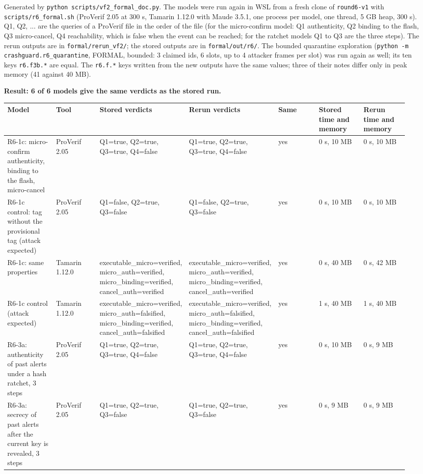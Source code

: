 


Generated by \texttt{python scripts/vf2\_formal\_doc.py}. The models were run again in WSL from a fresh clone of \texttt{round6-v1} with \texttt{scripts/r6\_formal.sh} (ProVerif 2.05 at 300 s, Tamarin 1.12.0 with Maude 3.5.1, one process per model, one thread, 5 GB heap, 300 s). Q1, Q2, ... are the queries of a ProVerif file in the order of the file (for the micro-confirm model: Q1 authenticity, Q2 binding to the flash, Q3 micro-cancel, Q4 reachability, which is false when the event can be reached; for the ratchet models Q1 to Q3 are the three steps). The rerun outputs are in \texttt{formal/rerun\_vf2/}; the stored outputs are in \texttt{formal/out/r6/}. The bounded quarantine exploration (\texttt{python -m crashguard.r6\_quarantine}, FORMAL, bounded: 3 claimed ids, 6 slots, up to 4 attacker frames per slot) was run again as well; its ten keys \texttt{r6.f3b.*} are equal. The \texttt{r6.f.*} keys written from the new outputs have the same values; three of their notes differ only in peak memory (41 against 40 MB).

\textbf{Result: 6 of 6 models give the same verdicts as the stored run.}

{\scriptsize\raggedright
\begin{longtable}{p{0.136\linewidth}p{0.136\linewidth}p{0.136\linewidth}p{0.136\linewidth}p{0.136\linewidth}p{0.136\linewidth}p{0.136\linewidth}}
\toprule
Model & Tool & Stored verdicts & Rerun verdicts & Same & Stored time and memory & Rerun time and memory \\
\midrule
\endhead
R6-1c: micro-confirm authenticity, binding to the flash, micro-cancel & ProVerif 2.05 & Q1=true, Q2=true, Q3=true, Q4=false & Q1=true, Q2=true, Q3=true, Q4=false & yes & 0 s, 10 MB & 0 s, 10 MB \\
R6-1c control: tag without the provisional tag (attack expected) & ProVerif 2.05 & Q1=false, Q2=true, Q3=false & Q1=false, Q2=true, Q3=false & yes & 0 s, 10 MB & 0 s, 10 MB \\
R6-1c: same properties & Tamarin 1.12.0 & executable\_micro=verified, micro\_auth=verified, micro\_binding=verified, cancel\_auth=verified & executable\_micro=verified, micro\_auth=verified, micro\_binding=verified, cancel\_auth=verified & yes & 0 s, 40 MB & 0 s, 42 MB \\
R6-1c control (attack expected) & Tamarin 1.12.0 & executable\_micro=verified, micro\_auth=falsified, micro\_binding=verified, cancel\_auth=falsified & executable\_micro=verified, micro\_auth=falsified, micro\_binding=verified, cancel\_auth=falsified & yes & 1 s, 40 MB & 1 s, 40 MB \\
R6-3a: authenticity of past alerts under a hash ratchet, 3 steps & ProVerif 2.05 & Q1=true, Q2=true, Q3=true, Q4=false & Q1=true, Q2=true, Q3=true, Q4=false & yes & 0 s, 10 MB & 0 s, 9 MB \\
R6-3a: secrecy of past alerts after the current key is revealed, 3 steps & ProVerif 2.05 & Q1=true, Q2=true, Q3=false & Q1=true, Q2=true, Q3=false & yes & 0 s, 9 MB & 0 s, 9 MB \\
\bottomrule
\end{longtable}}


